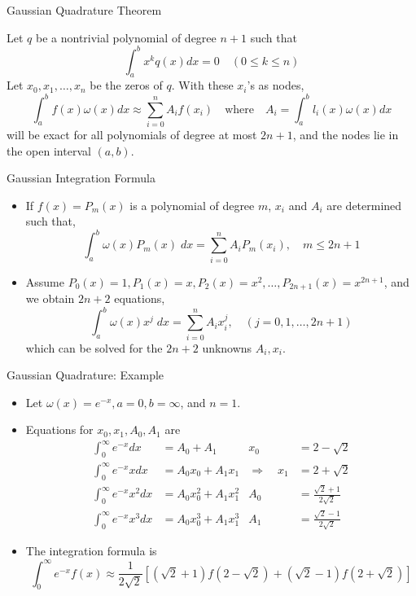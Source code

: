 \documentclass{beamer}
\newcommand{\beforeverb}{\footnotesize}
\newcommand{\afterverb}{\normalsize}
\begin{document}
\begin{frame}{Gaussian Quadrature Theorem}
\begin{theorem}


Let $q$ be a nontrivial polynomial of degree $n+1$ such that
\[
\int_a^b x^k q(x) dx=0\quad (0\le k\le n)
\]
Let $x_0, x_1, \ldots, x_n$ be the zeros of $q$. With these $x_i$'s as nodes, 
\[
\int_a^b f(x) \omega(x) dx \approx \sum_{i=0}^n A_i f(x_i) \quad\mbox{where} \quad A_i=\int_a^b l_i(x)\omega(x)  dx 
\]
will be exact for all polynomials of degree at most $2n+1$, and the nodes lie in the open interval $(a,b)$.
\end{theorem}
\end{frame}
\begin{frame}{Gaussian Integration Formula}
\begin{itemize}
\item If $f(x)=P_m(x)$ is a polynomial of degree $m$, $x_i$ and $A_i$ are determined such that,
\[
\int_a ^b \omega(x) P_m(x)\; dx =\sum_{i=0}^n A_i P_m(x_i), \quad m\le 2n+1
\]
\item Assume $P_0(x)=1, P_1(x)=x, P_2(x)=x^2, \ldots, P_{2n+1}(x)=x^{2n+1}$, and we obtain $2n+2$ equations,
\[
\int_a ^b \omega(x) x^j \; dx =\sum_{i=0}^n A_i x^j_i, \quad (j=0, 1, \ldots, 2n+1)
\]
which can be solved for the $2n+2$ unknowns $A_i, x_i$.
 
\end{itemize}
\end{frame}
\begin{frame}{Gaussian Quadrature: Example}
\begin{itemize}
\item Let $\omega(x)=e^{-x}, a=0, b=\infty$, and $n=1$. 
\item Equations for $x_0, x_1, A_0, A_1$ are
\beforeverb
\begin{align*}
\int_0^\infty e^{-x} dx&=A_0+A_1 &  x_0&= 2-\sqrt{2}  \\
\int_0^\infty e^{-x} x dx&=A_0 x_0 +A_1 x_1 &\Rightarrow \quad x_1&=2+\sqrt{2}\\
\int_0^\infty e^{-x} x^2 dx&=A_0 x_0^2+A_1 x_1^2 & A_0&=\frac{\sqrt{2}+1}{2\sqrt{2}}\\
\int_0^\infty e^{-x} x^3 dx&=A_0 x_0^3+A_1 x_1^3  &A_1&=\frac{\sqrt{2}-1}{2\sqrt{2}} 
\end{align*}
\afterverb
\item The integration formula is 
\beforeverb
\[
\int_0^\infty e^{-x} f(x) \approx \frac{1}{2\sqrt{2}} \left[(\sqrt{2}+1)f(2-\sqrt{2})+(\sqrt{2}-1)f(2+\sqrt{2})\right]
\]
\afterverb
\end{itemize}
\end{frame}
\end{document}
